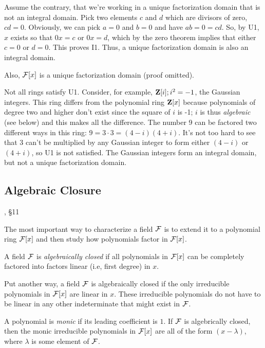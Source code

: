\proof

Assume the contrary, that we're working in a unique factorization
domain that is not an integral domain.  Pick two elements $c$ and $d$
which are divisors of zero, $cd=0$.  Obviously, we can pick $a=0$ and
$b=0$ and have $ab=0=cd$.  So, by U1, $x$ exists so that $0x=c$ or
$0x=d$, which by the zero theorem implies that either $c=0$ or $d=0$.
This proves I1.  Thus, a unique factorization domain is also an
integral domain.

\endtheorem

Also, ${\cal F}[x]$ is a unique
factorization domain (proof omitted).

Not all rings satisfy U1.  Consider, for example, ${\bf Z}[i];
i^2=-1$, the Gaussian integers.  This ring differs from the polynomial
ring ${\bf Z}[x]$ because polynomials of degree two and higher don't
exist since the square of $i$ is -1; $i$ is thus {\it algebraic} (see
below) and this makes all the difference.  The number 9 can be
factored two different ways in this ring: $9=3\cdot3=(4-i)(4+i)$.
It's not too hard to see that 3 can't be multiplied by any Gaussian
integer to form either $(4-i)$ or $(4+i)$, so U1 is not satisfied.
The Gaussian integers form an integral domain, but not a unique
factorization domain.

\subsection*{\qquad Algebraic Closure}
, \S11

The most important way to characterize a field ${\cal F}$ is to extend
it to a polynomial ring ${\cal F}[x]$ and then study how polynomials
factor in ${\cal F}[x]$.

\begin{key point}
A field ${\cal F}$ is {\it algebraically closed} if all
polynomials in ${\cal F}[x]$ can be completely factored
into factors linear (i.e, first degree) in $x$.
\end{key point}

Put another way, a field ${\cal F}$ is algebraically closed if the
only irreducible polynomials in ${\cal F}[x]$ are linear in $x$.
These irreducible polynomials do not have to be linear in any other
indeterminate that might exist in ${\cal F}$.

A polynomial is {\it monic} if its leading coefficient is $1$.  If
${\cal F}$ is algebrically closed, then the monic irreducible
polynomials in ${\cal F}[x]$ are all of the form $(x-\lambda)$, where
$\lambda$ is some element of ${\cal F}$.


